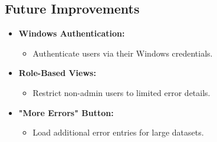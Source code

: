 \documentclass[12pt]{article}
\begin{document}
\subsection*{Future Improvements}
\begin{itemize}
    \item \textbf{Windows Authentication:}
    \begin{itemize}
        \item Authenticate users via their Windows credentials.
    \end{itemize}
    \item \textbf{Role-Based Views:}
    \begin{itemize}
        \item Restrict non-admin users to limited error details.
    \end{itemize}
    \item \textbf{"More Errors" Button:}
    \begin{itemize}
        \item Load additional error entries for large datasets.
    \end{itemize}
\end{itemize}
\end{document}
